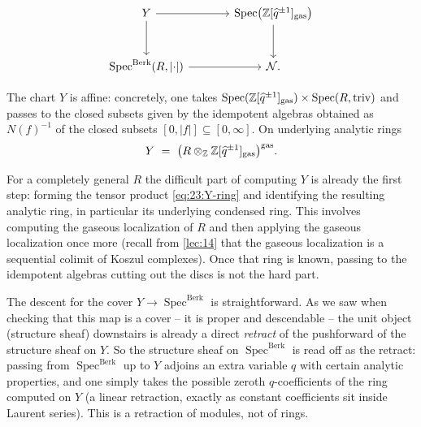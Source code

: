 \begin{equation*}
\begin{tikzcd}[column sep=large, row sep=large]
Y \arrow[r] \arrow[d] &
\operatorname{Spec}\bigl(\mathbb Z[\widehat q^{\pm1}]_\gasx\bigr)
  \arrow[d] \\
\operatorname{Spec}^{\mathrm{Berk}}(R,\lvert\cdot\rvert) \arrow[r] & \mathcal N .
\end{tikzcd}
\end{equation*}

\begin{proposition}
\label{prop:23:chart-affine}
The chart $Y$ is affine: concretely, one takes
$\operatorname{Spec}(\mathbb Z[\widehat q^{\pm1}]_{\mathrm{gas}})\times
\operatorname{Spec}(R,\mathrm{triv})$ and passes to the closed subsets given by
the idempotent algebras obtained as $N(f)^{-1}$ of the closed subsets
$[0,\lvert f\rvert]\subseteq[0,\infty]$. On underlying analytic rings
\begin{equation}
\label{eq:23:Y-ring}
Y\ =\ \bigl(R\otimes_{\mathbb Z}\mathbb Z[\widehat q^{\pm1}]_{\mathrm{gas}}\bigr)^{\mathrm{gas}}.
\end{equation}
\end{proposition}

For a completely general $R$ the difficult part of computing $Y$ is already the
first step: forming the tensor product \eqref{eq:23:Y-ring} and identifying the
resulting analytic ring, in particular its underlying condensed ring. This
involves computing the gaseous localization of $R$ and then applying the gaseous
localization once more (recall from \cref{lec:14} that the gaseous localization
is a sequential colimit of Koszul complexes). Once that ring is known, passing to
the idempotent algebras cutting out the discs is not the hard part.

\begin{remark}
\label{rmk:23:descent-zeroth}
The descent for the cover $Y\to\operatorname{Spec}^{\mathrm{Berk}}$ is
straightforward. As we saw when checking that this map is a cover -- it is
proper and descendable -- the unit object (structure sheaf) downstairs is
already a direct \emph{retract} of the pushforward of the structure sheaf on
$Y$. So the structure sheaf on $\operatorname{Spec}^{\mathrm{Berk}}$ is read off
as the retract: passing from $\operatorname{Spec}^{\mathrm{Berk}}$ up to $Y$
adjoins an extra variable $q$ with certain analytic properties, and one simply
takes the possible zeroth $q$-coefficients of the ring computed on $Y$ (a linear
retraction, exactly as constant coefficients sit inside Laurent series). This is
a retraction of modules, not of rings.
\end{remark}

